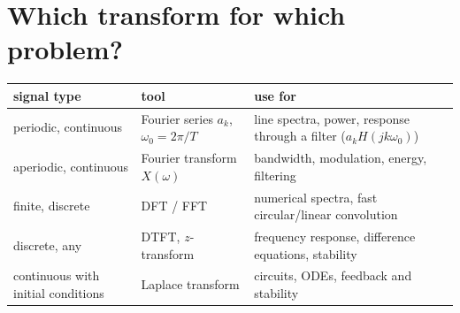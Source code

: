 \section{Which transform for which problem?}
\begin{center}\small\renewcommand{\arraystretch}{1.3}\begin{tabular}{@{}p{3.6cm}p{5.4cm}p{5.2cm}@{}}\toprule
signal type&tool&use for\\\midrule
periodic, continuous&Fourier series $a_k$, $\omega_0=2\pi/T$&line spectra, power, response through a filter ($a_kH(jk\omega_0)$)\\
aperiodic, continuous&Fourier transform $X(\omega)$&bandwidth, modulation, energy, filtering\\
finite, discrete&DFT / FFT&numerical spectra, fast circular/linear convolution\\
discrete, any&DTFT, $z$-transform&frequency response, difference equations, stability\\
continuous with initial conditions&Laplace transform&circuits, ODEs, feedback and stability\\\bottomrule\end{tabular}\end{center}
